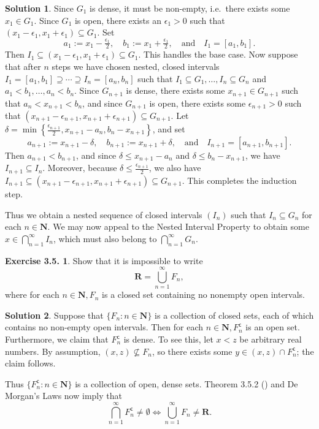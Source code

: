 \documentclass[12pt]{article}
\theoremstyle{definition}
\theoremstyle{exercise}
\newtheorem{exercise}{Exercise 3.5.}
\theoremstyle{solution}
\newtheorem*{solution}{Solution}
\newcommand{\setcomp}[1]{#1^{\mathsf{c}}}
\newcommand{\quand}{\quad \text{and} \quad}
\newcommand{\N}{\mathbf{N}}
\newcommand{\R}{\mathbf{R}}
\begin{document}
\begin{solution}
    Since \( G_1 \) is dense, it must be non-empty, i.e.\ there exists some \( x_1 \in G_1 \). Since \( G_1 \) is open, there exists an \( \epsilon_1 > 0 \) such that \( (x_1 - \epsilon_1, x_1 + \epsilon_1) \subseteq G_1 \). Set
    \[
        a_1 := x_1 - \tfrac{\epsilon_1}{2}, \quad b_1 := x_1 + \tfrac{\epsilon_1}{2}, \quand I_1 = [a_1, b_1].
    \]
    Then \( I_1 \subseteq (x_1 - \epsilon_1, x_1 + \epsilon_1) \subseteq G_1 \). This handles the base case. Now suppose that after \( n \) steps we have chosen nested, closed intervals \( I_1 = [a_1, b_1] \supseteq \cdots \supseteq I_n = [a_n, b_n] \) such that \( I_1 \subseteq G_1, \ldots, I_n \subseteq G_n \) and \( a_1 < b_1, \ldots, a_n < b_n \). Since \( G_{n+1} \) is dense, there exists some \( x_{n+1} \in G_{n+1} \) such that \( a_n < x_{n+1} < b_n \), and since \( G_{n+1} \) is open, there exists some \( \epsilon_{n+1} > 0 \) such that \( (x_{n+1} - \epsilon_{n+1}, x_{n+1} + \epsilon_{n+1}) \subseteq G_{n+1} \). Let \( \delta = \min \left\{ \tfrac{\epsilon_{n+1}}{2}, x_{n+1} - a_n, b_n - x_{n+1} \right\} \), and set
    \[
        a_{n+1} := x_{n+1} - \delta, \quad b_{n+1} := x_{n+1} + \delta, \quand I_{n+1} = [a_{n+1}, b_{n+1}].
    \]
    Then \( a_{n+1} < b_{n+1} \), and since \( \delta \leq x_{n+1} - a_n \) and \( \delta \leq b_n - x_{n+1} \), we have \( I_{n+1} \subseteq I_n \). Moreover, because \( \delta \leq \tfrac{\epsilon_{n+1}}{2} \), we also have \( I_{n+1} \subseteq (x_{n+1} - \epsilon_{n+1}, x_{n+1} + \epsilon_{n+1}) \subseteq G_{n+1} \). This completes the induction step.

    Thus we obtain a nested sequence of closed intervals \( (I_n) \) such that \( I_n \subseteq G_n \) for each \( n \in \N \). We may now appeal to the Nested Interval Property to obtain some \( x \in \bigcap_{n=1}^{\infty} I_n \), which must also belong to \( \bigcap_{n=1}^{\infty} G_n \).
\end{solution}

\begin{exercise}
\label{ex:5}
    Show that it is impossible to write
    \[
        \R = \bigcup_{n=1}^{\infty} F_n,
    \]
    where for each \( n \in \N, F_n \) is a closed set containing no nonempty open intervals.
\end{exercise}

\begin{solution}
    Suppose that \( \{ F_n : n \in \N \} \) is a collection of closed sets, each of which contains no non-empty open intervals. Then for each \( n \in \N, \setcomp{F_n} \) is an open set. Furthermore, we claim that \( \setcomp{F_n} \) is dense. To see this, let \( x < z \) be arbitrary real numbers. By assumption, \( (x, z) \not\subseteq F_n \), so there exists some \( y \in (x, z) \cap \setcomp{F_n} \); the claim follows.

    Thus \( \{ \setcomp{F_n} : n \in \N \} \) is a collection of open, dense sets. Theorem 3.5.2 () and De Morgan's Laws now imply that
    \[
        \bigcap_{n=1}^{\infty} \setcomp{F_n} \neq \emptyset \iff \bigcup_{n=1}^{\infty} F_n \neq \R.
    \]
\end{solution}
\end{document}
